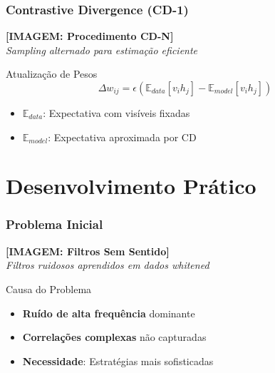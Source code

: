 \documentclass[aspectratio=169]{beamer}
\begin{document}
\begin{frame}
\frametitle{Contrastive Divergence (CD-1)}
\begin{center}
\textbf{[IMAGEM: Procedimento CD-N]}\\
\textit{Sampling alternado para estimação eficiente}
\end{center}

\begin{exampleblock}{Atualização de Pesos}
\begin{equation}
\Delta w_{ij} = \epsilon \left( \mathbb{E}_{data}[v_i h_j] - \mathbb{E}_{model}[v_i h_j] \right)
\end{equation}
\begin{itemize}
    \item $\mathbb{E}_{data}$: Expectativa com visíveis fixadas
    \item $\mathbb{E}_{model}$: Expectativa aproximada por CD
\end{itemize}
\end{exampleblock}
\end{frame}

\section{Desenvolvimento Prático}

\begin{frame}
\frametitle{Problema Inicial}
\begin{center}
\textbf{[IMAGEM: Filtros Sem Sentido]}\\
\textit{Filtros ruidosos aprendidos em dados whitened}
\end{center}

\begin{alertblock}{Causa do Problema}
\begin{itemize}
    \item \textcolor{azulescuro}{\textbf{Ruído de alta frequência}} dominante
    \item \textcolor{azulescuro}{\textbf{Correlações complexas}} não capturadas  
    \item \textcolor{azulescuro}{\textbf{Necessidade}}: Estratégias mais sofisticadas
\end{itemize}
\end{alertblock}
\end{frame}
\end{document}
